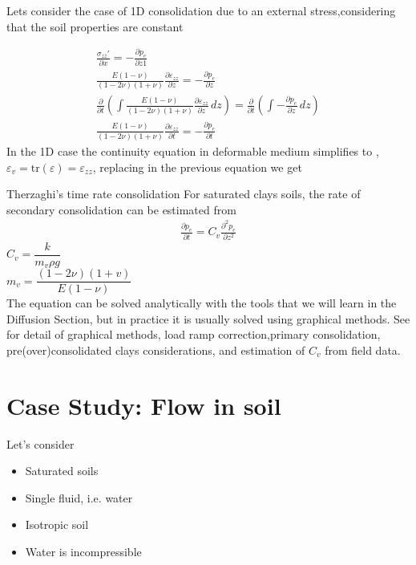 \documentclass[a4paper, 11pt,article,oneside]{memoir}%
\begin{document}
Lets consider the case of 1D consolidation due to an external stress,considering that the soil properties are constant

\begin{gather*}
\frac{\sigma_{zz}'}{\partial x}=-\frac{\partial p_e}{\partial z1}\\
\frac{E(1-\nu)}{(1-2\nu)(1+\nu)}\frac{\partial \varepsilon_{zz}}{\partial z}=-\frac{\partial p_e}{\partial z}\\
 \frac{\partial }{\partial t}\left(\int\frac{E(1-\nu)}{(1-2\nu)(1+\nu)}\frac{\partial \varepsilon_{zz}}{\partial z}\, dz\right) =\frac{\partial}{\partial t} \left(\int -\frac{\partial p_e}{\partial z}\, dz\right) \\
\frac{E(1-\nu)}{(1-2\nu)(1+\nu)}\frac{\partial \varepsilon_{zz}}{\partial t}=-\frac{\partial p_e}{\partial t}\
\end{gather*}
In the 1D case the continuity equation in deformable medium simplifies to , $\varepsilon_v=\text{tr}(\varepsilon)=\varepsilon_{zz}$, replacing in the previous equation we get 
\begin{eqbox2}{}{Therzaghi's time rate consolidation}
For saturated clays soils, the rate of secondary consolidation can be estimated from
\begin{gather*}
\frac{\partial p_e}{\partial t}=C_v \frac{\partial^2 p_e}{\partial z^2}
\end{gather*}
 $C_v=\dfrac{k}{m_v\rho g}$\\
 $m_v=\dfrac{(1-2\nu)(1+v)}{E(1-\nu)}$\\
 
 The equation can be solved analytically with the tools that we will learn in the {\color{magenta}Diffusion Section}, but in practice it is usually solved using graphical methods. See \cite{ICE2604} for detail of graphical methods, load ramp correction,primary consolidation, pre(over)consolidated clays considerations, and estimation of $C_v$ from field data.
\end{eqbox2}
\section{Case Study: Flow in soil}
Let's consider
\begin{itemize}
\item Saturated soils
\item Single fluid, i.e. water
\item Isotropic soil
\item Water is incompressible
\end{itemize}
\end{document}
